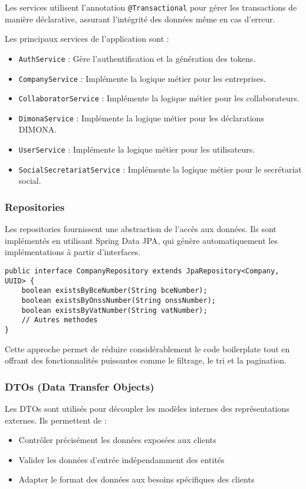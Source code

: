 Les services utilisent l'annotation \texttt{@Transactional} pour gérer les transactions de manière déclarative, assurant l'intégrité des données même en cas d'erreur.

Les principaux services de l'application sont :
\begin{itemize}
  \item \texttt{AuthService} : Gère l'authentification et la génération des tokens.
  \item \texttt{CompanyService} : Implémente la logique métier pour les entreprises.
  \item \texttt{CollaboratorService} : Implémente la logique métier pour les collaborateurs.
  \item \texttt{DimonaService} : Implémente la logique métier pour les déclarations DIMONA.
  \item \texttt{UserService} : Implémente la logique métier pour les utilisateurs.
  \item \texttt{SocialSecretariatService} : Implémente la logique métier pour le secrétariat social.
\end{itemize}

\subsubsection{Repositories}

Les repositories fournissent une abstraction de l'accès aux données. Ils sont implémentés en utilisant Spring Data JPA, qui génère automatiquement les implémentations à partir d'interfaces.

\begin{lstlisting}
public interface CompanyRepository extends JpaRepository<Company, UUID> {
    boolean existsByBceNumber(String bceNumber);
    boolean existsByOnssNumber(String onssNumber);
    boolean existsByVatNumber(String vatNumber);
    // Autres methodes
}
\end{lstlisting}

Cette approche permet de réduire considérablement le code boilerplate tout en offrant des fonctionnalités puissantes comme le filtrage, le tri et la pagination.

\subsubsection{DTOs (Data Transfer Objects)}

Les DTOs sont utilisés pour découpler les modèles internes des représentations externes. Ils permettent de :
\begin{itemize}
  \item Contrôler précisément les données exposées aux clients
  \item Valider les données d'entrée indépendamment des entités
  \item Adapter le format des données aux besoins spécifiques des clients
\end{itemize}

